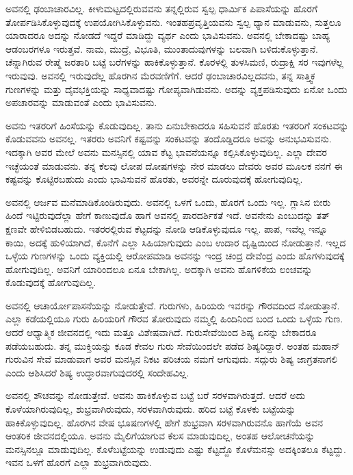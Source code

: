 ಅವನಲ್ಲಿ ಢಂಬಾಚಾರವಿಲ್ಲ. ಕೀಳುಮಟ್ಟದಲ್ಲಿರುವವನು ತನ್ನಲ್ಲಿರುವ ಸ್ವಲ್ಪ ಧಾರ್ಮಿಕ ಪಿಪಾಸೆಯನ್ನು ಹೊರಗೆ ತೋರ್ಪಡಿಸಿಕೊಳ್ಳುವುದಕ್ಕೆ ಉಪಯೋಗಿಸಿಕೊಳ್ಳುವನು. ಇಂತಹ\break ಪ್ರವೃತ್ತಿಯವನು ಸ್ವಲ್ಪ ಧ್ಯಾನ ಮಾಡುವನು, ಸುತ್ತಲೂ ಯಾರಾದರೂ ಅದನ್ನು ನೋಡದೆ ಇದ್ದರೆ ಮಾಡಿದ್ದು ವ್ಯರ್ಥ ಎಂದು ಭಾವಿಸುವನು. ಅವನಲ್ಲಿ ಬೇಕಾದಷ್ಟು ಬಾಹ್ಯ ಆಡಂಬರಗಳೂ ಇರುತ್ತವೆ. ನಾಮ, ಮುದ್ರೆ, ವಿಭೂತಿ, ಮುಂತಾದುವುಗಳನ್ನು ಬಲವಾಗಿ ಬಳಿದುಕೊಳ್ಳುತ್ತಾನೆ. ಚೆನ್ನಾಗಿರುವ ರೇಷ್ಮೆ ಜರತಾರಿ ಬಟ್ಟೆ ಬರೆಗಳನ್ನು ಹಾಕಿಕೊಳ್ಳುತ್ತಾನೆ. ಕೊರಳಲ್ಲಿ ತುಳಸಿಮಣಿ, ರುದ್ರಾಕ್ಷಿ ಸರ ಇವುಗಳೆಲ್ಲ ಇರುವುವು. ಅವನಲ್ಲಿ ಇರುವುದೆಲ್ಲ ಹೊರಗಿನ ಮೆರವಣಿಗೆಗೆ. ಆದರೆ ಢಂಬಾಚಾರವಿಲ್ಲದವನು, ತನ್ನ ಸಾತ್ತ್ವಿಕ ಗುಣಗಳನ್ನು ಮತ್ತು ದೈವಭಕ್ತಿಯನ್ನು ಸಾಧ್ಯವಾದಷ್ಟು ಗೋಪ್ಯವಾಗಿಡುವನು. ಅದನ್ನು ವ್ಯಕ್ತಪಡಿಸುವುದು ಏನೋ ಒಂದು ಅಪಚಾರವನ್ನು ಮಾಡುವಂತೆ ಎಂದು ಭಾವಿಸುವನು.

ಅವನು ಇತರರಿಗೆ ಹಿಂಸೆಯನ್ನು ಕೊಡುವುದಿಲ್ಲ. ತಾನು ಏನುಬೇಕಾದರೂ ಸಹಿಸುವನೆ ಹೊರತು ಇತರರಿಗೆ ಸಂಕಟವನ್ನು ಕೊಡುವವನು ಅವನಲ್ಲ. ಇತರರು ಅವನಿಗೆ ಕಷ್ಟವನ್ನು ಸಂಕಟವನ್ನು ತಂದೊಡ್ಡಿದರೂ ಅವನ್ನು ಅನುಭವಿಸುವನು. ಇದಕ್ಕಾಗಿ ಅವರ ಮೇಲೆ ಅವನು ಮನಸ್ಸಿನಲ್ಲಿ ಯಾವ ಕೆಟ್ಟ ಭಾವನೆಯನ್ನೂ ಕಲ್ಪಿಸಿಕೊಳ್ಳುವುದಿಲ್ಲ. ಎಲ್ಲಾ ದೇವರ ಇಚ್ಛೆಯಂತೆ ಮಾಡುವನು. ತನ್ನ ಕೆಲವು ಲೋಪ ದೋಷಗಳನ್ನು ನೇರ ಮಾಡಲು ದೇವರು ಅವರ ಮೂಲಕ ನನಗೆ ಈ ಕಷ್ಟವನ್ನು ಕೊಟ್ಟಿರಬಹುದು ಎಂದು ಭಾವಿಸುವನೆ ಹೊರತು, ಅವರನ್ನೇ ದೂರುವುದಕ್ಕೆ ಹೋಗುವುದಿಲ್ಲ. 

ಅವನಲ್ಲಿ ಆರ್ಜವ ಮನೆಮಾಡಿಕೊಂಡಿರುವುದು. ಅವನಲ್ಲಿ ಒಳಗೆ ಒಂದು, ಹೊರಗೆ ಒಂದು ಇಲ್ಲ. ಗ್ಲಾಸಿನ ಬೀರು ಹಿಂದೆ ಇಟ್ಟಿರುವುದೆಲ್ಲಾ ಹೇಗೆ ಕಾಣುವುದೊ ಹಾಗೆ ಅವನಲ್ಲಿ ಪಾರದರ್ಶಿಕತೆ ಇದೆ. ಅವನೇನು ಎಂಬುದನ್ನು ತತ್​ಕ್ಷಣವೇ ಹೇಳಿಬಿಡಬಹುದು. ಇತರರಲ್ಲಿರುವ ಕೆಟ್ಟದನ್ನು ನೋಡಿ ಆಡಿಕೊಳ್ಳುವುದೂ ಇಲ್ಲ. ಪಾಪ, ಇವೆಲ್ಲ ಇನ್ನೂ ಕಾಯಿ, ಅದಕ್ಕೆ ಹುಳಿಯಾಗಿದೆ, ಕೊನೆಗೆ ಎಲ್ಲಾ ಸಿಹಿಯಾಗುವುದು ಎಂಬ ಉದಾರ ದೃಷ್ಟಿಯಿಂದ ನೋಡುತ್ತಾನೆ. ಇಲ್ಲದ ಒಳ್ಳೆಯ ಗುಣಗಳನ್ನು ಒಂದು ವ್ಯಕ್ತಿಯಲ್ಲಿ ಆರೋಪಮಾಡಿ ಅವನನ್ನು ಇಂದ್ರ ಚಂದ್ರ ದೇವೆಂದ್ರ ಎಂದು ಹೊಗಳುವುದಕ್ಕೆ ಹೋಗುವುದಿಲ್ಲ. ಅವನಿಗೆ ಯಾರಿಂದಲೂ ಏನೂ ಬೇಕಾಗಿಲ್ಲ. ಅದಕ್ಕಾಗಿ ಅವನು ಹೊಗಳಿಕೆಯ ಲಂಚವನ್ನು ಕೊಡುವುದಕ್ಕೆ ಹೋಗುವುದಿಲ್ಲ.

ಅವನಲ್ಲಿ ಆಚಾರ್ಯೋಪಾಸನೆಯನ್ನು ನೋಡುತ್ತೇವೆ. ಗುರುಗಳು, ಹಿರಿಯರು ಇವರನ್ನು ಗೌರವದಿಂದ ನೋಡುತ್ತಾನೆ. ಎಲ್ಲಾ ಕಡೆಯಲ್ಲಿಯೂ ಗುರು ಹಿರಿಯರಿಗೆ ಗೌರವ ತೋರುವುದು ನಮ್ಮಲ್ಲಿ ಹಿಂದಿನಿಂದ ಬಂದ ಒಂದು ಒಳ್ಳೆಯ ಗುಣ. ಆದರೆ ಆಧ್ಯಾತ್ಮಿಕ ಜೀವನದಲ್ಲಿ ಇದು ಮತ್ತೂ ವಿಶೇಷವಾಗಿದೆ. ಗುರುಸೇವೆಯಿಂದ ಶಿಷ್ಯ ಏನನ್ನು ಬೇಕಾದರೂ ಪಡೆಯಬಹುದು. ತನ್ನ ಮುಕ್ತಿಯನ್ನು ಕೂಡ ಕೇವಲ ಗುರು ಸೇವೆಯಿಂದಲೇ ಪಡೆದ ಶಿಷ್ಯರಿದ್ದಾರೆ. ಅಂತಹ ಮಹಾನ್ ಗುರುವಿನ ಸೇವೆ ಮಾಡುವಾಗ ಅವರ ಮನಸ್ಸಿನ ನಿಕಟ ಪರಿಚಯ ನಮಗೆ ಆಗುವುದು. ಸದ್ಗುರು ಶಿಷ್ಯ ಜಾಗ್ರತನಾಗಲಿ ಎಂದು ಆಶಿಸಿದರೆ ಶಿಷ್ಯ ಉದ್ಧಾರವಾಗುವುದರಲ್ಲಿ ಸಂದೇಹವಿಲ್ಲ.

\newpage

ಅವನಲ್ಲಿ ಶೌಚವನ್ನು ನೋಡುತ್ತೇವೆ. ಅವನು ಹಾಕಿಕೊಳ್ಳುವ ಬಟ್ಟೆ ಬರೆ ಸರಳವಾಗಿರುತ್ತದೆ. ಆದರೆ ಅದು ಕೊಳೆಯಾಗಿರುವುದಿಲ್ಲ, ಶುಭ್ರವಾಗಿರುವುದು, ಸರಳವಾಗಿರುವುದು. ಹರಿದ ಬಟ್ಟೆ ಕೊಳಕು ಬಟ್ಟೆಯನ್ನು ಹಾಕಿಕೊಳ್ಳುವುದಿಲ್ಲ. ಹೊರಗಿನ ವೇಷ ಭೂಷಣಗಳಲ್ಲಿ ಹೇಗೆ ಶುಭ್ರವಾಗಿ ಸರಳವಾಗಿರುವನೊ ಹಾಗೆಯೆ ಅವನ ಆಂತರಿಕ ಜೀವನದಲ್ಲಿಯೂ. ಅವನು ಮೈಲಿಗೆಯಾಗುವ ಕೆಲಸ ಮಾಡುವುದಿಲ್ಲ, ಅಂತಹ ಆಲೋಚನೆಯನ್ನು ಮನಸ್ಸಿನಲ್ಲೂ ಮಾಡುವುದಿಲ್ಲ. ಕೊಳೆಬಟ್ಟೆಯನ್ನು ಉಡುವುದು ಎಷ್ಟು ಕೆಟ್ಟದ್ದೊ ಕೊಳೆಮನಸ್ಸು ಅದಕ್ಕಿಂತಲೂ ಕೆಟ್ಟದ್ದು. ಇವನ ಒಳಗೆ ಹೊರಗೆ ಎಲ್ಲಾ ಶುಭ್ರವಾಗಿರುವುದು.

